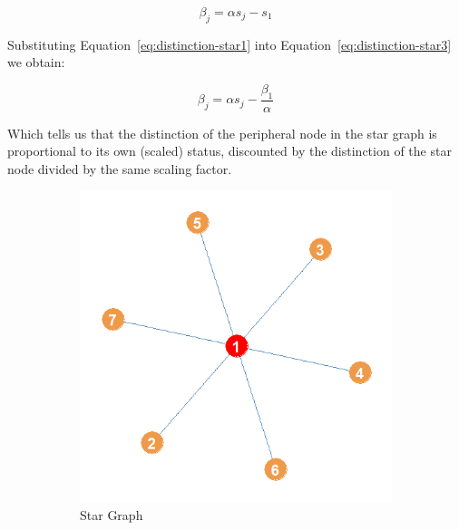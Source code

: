 \documentclass[12pt]{article}
\begin{document}
\begin{equation}
    \beta_j = \alpha s_j - s_1
    \label{eq:distinction-star3}
\end{equation}

Substituting Equation~\ref{eq:distinction-star1} into Equation~\ref{eq:distinction-star3} we obtain:

\begin{equation}
    \beta_j = \alpha s_j - \frac{\beta_1}{\alpha}
    \label{eq:distinction-star4}
\end{equation}

Which tells us that the distinction of the peripheral node in the star graph is proportional to its own (scaled) status, discounted by the distinction of the star node divided by the same scaling factor. 

\begin{figure}[ht!]
    \captionsetup[subfigure]{font=footnotesize,labelfont=footnotesize}
    \centering
     \begin{subfigure}[b]{0.3\textwidth}
        \includegraphics[width=1.0\textwidth]{Plots/Toys/star.png}
            \caption{Star Graph}
            \label{fig:star}
    \end{subfigure}
    \begin{subfigure}[b]{0.3\textwidth}

\end{subfigure}
\end{figure}
\end{document}
